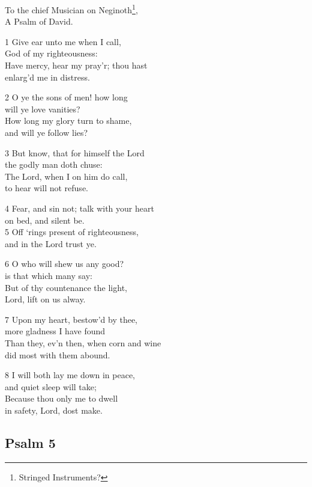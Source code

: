 To the chief Musician on Neginoth\footnote{Stringed Instruments?},\\
A Psalm of David.

1 Give ear unto me when I call,\\
God of my righteousness:\\
Have mercy, hear my pray’r; thou hast\\
enlarg’d me in distress.

2 O ye the sons of men! how long\\
will ye love vanities?\\
How long my glory turn to shame,\\
and will ye follow lies?

3 But know, that for himself the Lord\\
the godly man doth chuse:\\
The Lord, when I on him do call,\\
to hear will not refuse.

4 Fear, and sin not; talk with your heart\\
on bed, and silent be.\\
5 Off ‘rings present of righteousness,\\
and in the Lord trust ye.

6 O who will shew us any good?\\
is that which many say:\\
But of thy countenance the light,\\
Lord, lift on us alway.

7 Upon my heart, bestow’d by thee,\\
more gladness I have found\\
Than they, ev’n then, when corn and wine\\
did most with them abound.

8 I will both lay me down in peace,\\
and quiet sleep will take;\\
Because thou only me to dwell\\
in safety, Lord, dost make.

\begin{center}
\quad{}\quad{}
\end{center}


\subsection*{Psalm 5}

